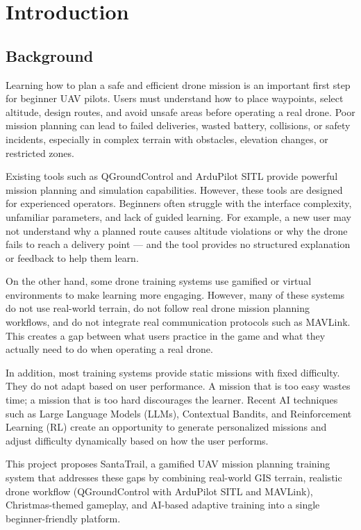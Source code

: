 \chapter{Introduction}
\label{chap:introduction}

\section{Background}
\label{section:background}

Learning how to plan a safe and efficient drone mission is an important first step for beginner UAV pilots. Users must understand how to place waypoints, select altitude, design routes, and avoid unsafe areas before operating a real drone. Poor mission planning can lead to failed deliveries, wasted battery, collisions, or safety incidents, especially in complex terrain with obstacles, elevation changes, or restricted zones.

Existing tools such as QGroundControl and ArduPilot SITL provide powerful mission planning and simulation capabilities. However, these tools are designed for experienced operators. Beginners often struggle with the interface complexity, unfamiliar parameters, and lack of guided learning. For example, a new user may not understand why a planned route causes altitude violations or why the drone fails to reach a delivery point — and the tool provides no structured explanation or feedback to help them learn.

On the other hand, some drone training systems use gamified or virtual environments to make learning more engaging. However, many of these systems do not use real-world terrain, do not follow real drone mission planning workflows, and do not integrate real communication protocols such as MAVLink. This creates a gap between what users practice in the game and what they actually need to do when operating a real drone.

In addition, most training systems provide static missions with fixed difficulty. They do not adapt based on user performance. A mission that is too easy wastes time; a mission that is too hard discourages the learner. Recent AI techniques such as Large Language Models (LLMs), Contextual Bandits, and Reinforcement Learning (RL) create an opportunity to generate personalized missions and adjust difficulty dynamically based on how the user performs.

This project proposes SantaTrail, a gamified UAV mission planning training system that addresses these gaps by combining real-world GIS terrain, realistic drone workflow (QGroundControl with ArduPilot SITL and MAVLink), Christmas-themed gameplay, and AI-based adaptive training into a single beginner-friendly platform.


